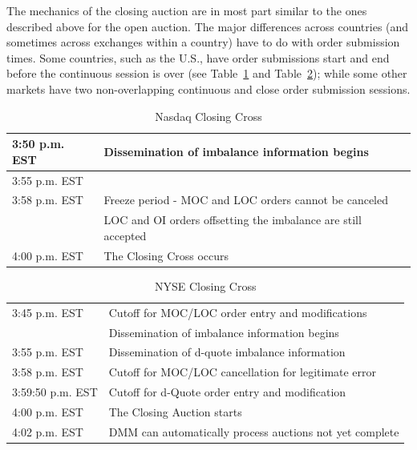 The mechanics of the closing auction are in most part similar to the ones described above for the open auction. The major differences across countries (and sometimes across exchanges within a country) have to do with order submission times. Some countries, such as the U.S., have order submissions start and end before the continuous session is over (see Table~\ref{tab:NASDAQclose} and Table~\ref{tab:NYSEclose}); while some other markets have two non-overlapping continuous and close order submission sessions.

\begin{table}[!ht]
   \centering
   \caption{Nasdaq Closing Cross\label{tab:NASDAQclose}}
   \begin{tabular}{ll} 
	3:50 p.m. EST & Dissemination of imbalance information begins  \\ \hline
	3:55 p.m. EST &  \\ \hline
	3:58 p.m. EST & Freeze period - MOC and LOC orders cannot be canceled  \\ 
	 & LOC and OI orders offsetting the imbalance are still accepted   \\ \hline	
	4:00 p.m. EST & The Closing Cross occurs		
   \end{tabular}
\end{table}	


\begin{table}[!ht]
   \centering
   \caption{NYSE Closing Cross\label{tab:NYSEclose}}
   \begin{tabular}{ll} 
	3:45 p.m. EST & Cutoff for MOC/LOC order entry and modifications  \\ 
	 & Dissemination of imbalance information begins  \\ \hline
	3:55 p.m. EST &  Dissemination of d-quote imbalance information\\ \hline
	3:58 p.m. EST & Cutoff for MOC/LOC cancellation for legitimate error \\ \hline
	3:59:50 p.m. EST & Cutoff for d-Quote order entry and modification \\ \hline
	4:00 p.m. EST & The Closing Auction starts \\ \hline
	4:02 p.m. EST & DMM can automatically process auctions not yet complete
   \end{tabular}
\end{table}	


